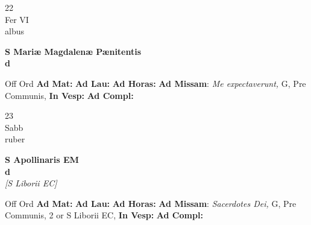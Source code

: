 \documentclass[10pt, openany]{book}
\begin{document}
        \begin{center}
            \begin{minipage}{3.5in}
                \vspace{2em}
                \begin{minipage}{0.5in}
                    {\Huge 22} \\
                    {\normalsize Fer VI} \\
                    {\normalsize albus}
                \end{minipage}
                \begin{minipage}{3.0in}
                    \textbf{ \large S Mariæ Magdalenæ Pænitentis \\
                    \textnormal{\normalsize d}} \\ 
                \end{minipage}
                \begin{justify}Off Ord
                    \textbf{Ad Mat: }
                    \textbf{Ad Lau: }
                    \textbf{Ad Horas: }\textbf{Ad Missam}: \textit{Me expectaverunt,} G, Pre Communis,  
                    \textbf{In Vesp: }
                    \textbf{Ad Compl: }
                \end{justify}
            \end{minipage}
        \end{center}
    
        \begin{center}
            \begin{minipage}{3.5in}
                \vspace{2em}
                \begin{minipage}{0.5in}
                    {\Huge 23} \\
                    {\normalsize Sabb} \\
                    {\normalsize ruber}
                \end{minipage}
                \begin{minipage}{3.0in}
                    \textbf{ \large S Apollinaris EM \\
                    \textnormal{\normalsize d}} \\ \textit{[S Liborii EC]} \\ 
                \end{minipage}
                \begin{justify}Off Ord
                    \textbf{Ad Mat: }
                    \textbf{Ad Lau: }
                    \textbf{Ad Horas: }\textbf{Ad Missam}: \textit{Sacerdotes Dei,} G, Pre Communis, 2 or S Liborii EC,  
                    \textbf{In Vesp: }
                    \textbf{Ad Compl: }
                \end{justify}
            \end{minipage}
        \end{center}
    
\end{document}
